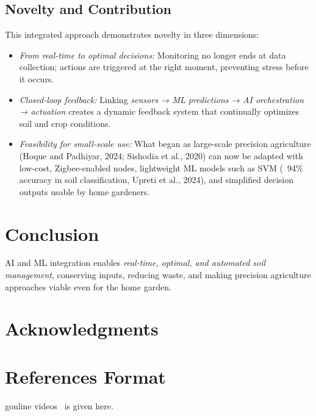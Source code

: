 \documentclass{sigchi}
\begin{document}
\subsection{Novelty and Contribution}
This integrated approach demonstrates novelty in three dimensions:
\begin{itemize}
\item \emph{From real-time to optimal decisions:} Monitoring no longer ends at data collection; actions are triggered at the right moment, preventing stress before it occurs.
\item \emph{Closed-loop feedback:} Linking \emph{sensors → ML predictions → AI orchestration → actuation} creates a dynamic feedback system that continually optimizes soil and crop conditions.
\item \emph{Feasibility for small-scale use:} What began as large-scale precision agriculture (Hoque and Padhiyar, 2024; Sishodia et al., 2020) can now be adapted with low-cost, Zigbee-enabled nodes, lightweight ML models such as SVM (~94\% accuracy in soil classification, Upreti et al., 2024), and simplified decision outputs usable by home gardeners.
\end{itemize}

\section{Conclusion}
AI and ML integration enables \emph{real-time, optimal, and automated soil management}, conserving inputs, reducing waste, and making precision agriculture approaches viable even for the home garden.

\section{Acknowledgments}
\balance{}

\section{References Format}
gonline videos~\cite{psy:gangnam} is given here.
\balance{}



\end{document}
